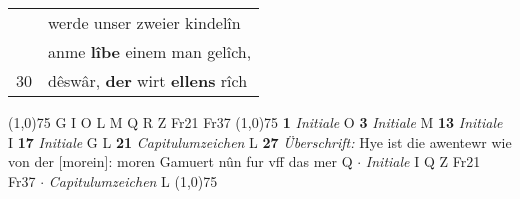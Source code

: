 \documentclass[8pt,a4paper,notitlepage]{article}
\begin{document}
\begin{table}[ht]
\begin{minipage}[t]{0.5\linewidth}
\begin{tabular}{rl}
 & werde unser zweier kindelîn\\ 
 & anme \textbf{lîbe} einem man gelîch,\\ 
30 & dêswâr, \textbf{der} wirt \textbf{ellens} rîch\\ 
\end{tabular}
\scriptsize
\line(1,0){75} \newline
G I O L M Q R Z Fr21 Fr37 \newline
\line(1,0){75} \newline
\textbf{1} \textit{Initiale} O  \textbf{3} \textit{Initiale} M  \textbf{13} \textit{Initiale} I  \textbf{17} \textit{Initiale} G L  \textbf{21} \textit{Capitulumzeichen} L  \textbf{27} \textit{Überschrift:} Hye ist die awentewr wie von der [morein]: moren Gamuert nûn fur vff das mer Q   $\cdot$ \textit{Initiale} I Q Z Fr21 Fr37   $\cdot$ \textit{Capitulumzeichen} L  \newline
\line(1,0){75} \newline

\end{minipage}
\end{table}
\end{document}
